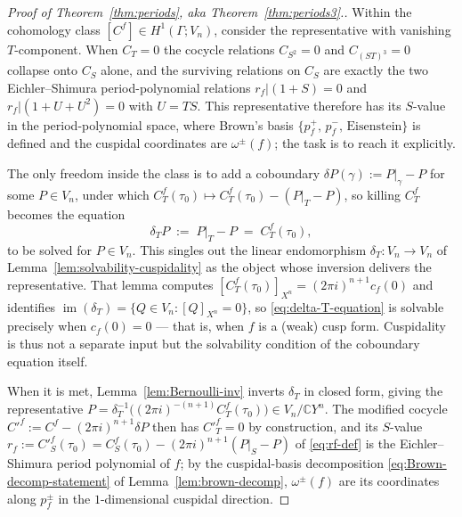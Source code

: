 \documentclass[11pt]{article}
\numberwithin{equation}{section}  %
\newcommand{\CC}{\mathbb{C}}
\begin{document}
\begin{proof}[Proof of Theorem~\ref{thm:periods}, aka Theorem~\ref{thm:periods3}.]
Within the cohomology class $[C^f] \in H^1(\Gamma; V_n)$, consider the
representative with vanishing $T$-component.  When $C_T = 0$ the cocycle
relations $C_{S^2} = 0$ and $C_{(ST)^3} = 0$ collapse onto $C_S$ alone,
and the surviving relations on $C_S$ are exactly the two Eichler--Shimura
period-polynomial relations $r_f|(1 + S) = 0$ and $r_f|(1 + U + U^2) = 0$
with $U = TS$.  This representative therefore has its $S$-value in the
period-polynomial space, where Brown's basis
$\{p^+_f,\, p^-_f,\, \text{Eisenstein}\}$ is defined and the cuspidal
coordinates are $\omega^\pm(f)$; the task is to reach it explicitly.

The only freedom inside the class is to add a coboundary
$\delta P(\gamma) := P|_\gamma - P$ for some $P \in V_n$, under which
$C^f_T(\tau_0) \mapsto C^f_T(\tau_0) - (P|_T - P)$, so killing $C^f_T$
becomes the equation
\begin{equation}\label{eq:delta-T-equation}
  \delta_T P \;:=\; P|_T - P \;=\; C^f_T(\tau_0),
\end{equation}
to be solved for $P \in V_n$.  This singles out the linear endomorphism
$\delta_T \colon V_n \to V_n$ of Lemma~\ref{lem:solvability-cuspidality}
as the object whose inversion delivers the representative.  That lemma
computes $[C^f_T(\tau_0)]_{X^n} = (2\pi i)^{n+1} c_f(0)$ and identifies
$\operatorname{im}(\delta_T) = \{Q \in V_n : [Q]_{X^n} = 0\}$, so
\eqref{eq:delta-T-equation} is solvable precisely when $c_f(0) = 0$ ---
that is, when $f$ is a (weak) cusp form.  Cuspidality is thus not a
separate input but the solvability condition of the coboundary equation
itself.

When it is met, Lemma~\ref{lem:Bernoulli-inv} inverts $\delta_T$ in closed
form, giving the representative
$P = \delta_T^{-1}\bigl((2\pi i)^{-(n+1)} C^f_T(\tau_0)\bigr) \in V_n/\CC Y^n$.
The modified cocycle $C'^f := C^f - (2\pi i)^{n + 1}\delta P$ then has
$C'^f_T = 0$ by construction, and its $S$-value
$r_f := C'^f_S(\tau_0) = C^f_S(\tau_0) - (2\pi i)^{n + 1}(P|_S - P)$ of
\eqref{eq:rf-def} is the Eichler--Shimura period polynomial of $f$; by the
cuspidal-basis decomposition \eqref{eq:Brown-decomp-statement} of
Lemma~\ref{lem:brown-decomp}, $\omega^\pm(f)$ are its coordinates along
$p^\pm_f$ in the $1$-dimensional cuspidal direction.


\end{proof}
\end{document}
